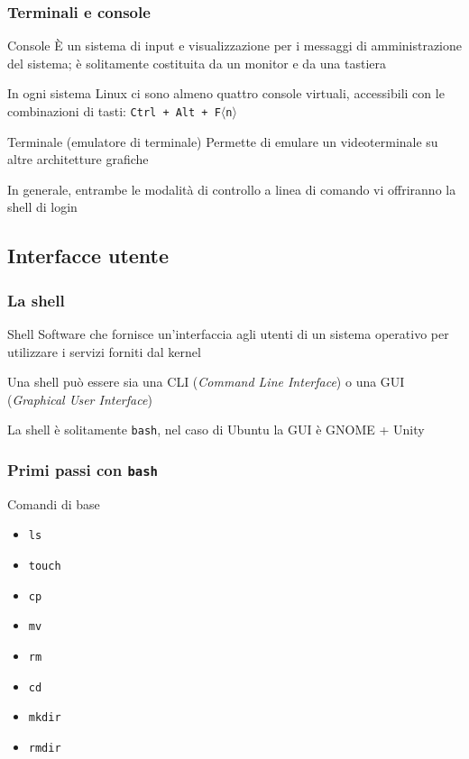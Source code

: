 \documentclass{beamer}
\newcommand{\param}[1]{$\langle$#1$\rangle$}
\begin{document}
\begin{frame}[t]
  \frametitle{Terminali e console}\small
  \begin{block}{Console}
    È un sistema di input e visualizzazione per i messaggi di amministrazione
    del sistema; è solitamente costituita da un monitor e da una tastiera
  \end{block}
  In ogni sistema Linux ci sono almeno quattro console virtuali, accessibili
  con le combinazioni di tasti: \texttt{Ctrl + Alt + F\alert{\param{n}}}
  \begin{block}{Terminale (emulatore di terminale)}
    Permette di emulare un videoterminale su altre architetture grafiche
  \end{block}

  In generale, entrambe le modalità di controllo a linea di comando vi
  offriranno la \alert{shell di login}

\end{frame}

\subsection{Interfacce utente}

\begin{frame}
  \frametitle{La shell}

  \begin{block}{Shell}
    Software che fornisce un'interfaccia agli utenti di un sistema operativo
    per utilizzare i servizi forniti dal kernel
  \end{block}

  Una shell può essere sia una CLI (\textit{Command Line Interface}) o una GUI
  (\textit{Graphical User Interface})

  \medskip
  La shell è solitamente \alert{\texttt{bash}}, nel caso di Ubuntu la GUI è
  \alert{GNOME + Unity} 
  
\end{frame}

\begin{frame}[t]
  \frametitle{Primi passi con \texttt{bash}}

  \begin{block}{Comandi di base}
    \begin{itemize}[<+->]
      \item \texttt{ls}
      \item \texttt{touch}
      \item \texttt{cp}
      \item \texttt{mv}
      \item \texttt{rm}
      \item \texttt{cd}
      \item \texttt{mkdir}
      \item \texttt{rmdir}
    \end{itemize}
  \end{block}

\end{frame}
\end{document}
